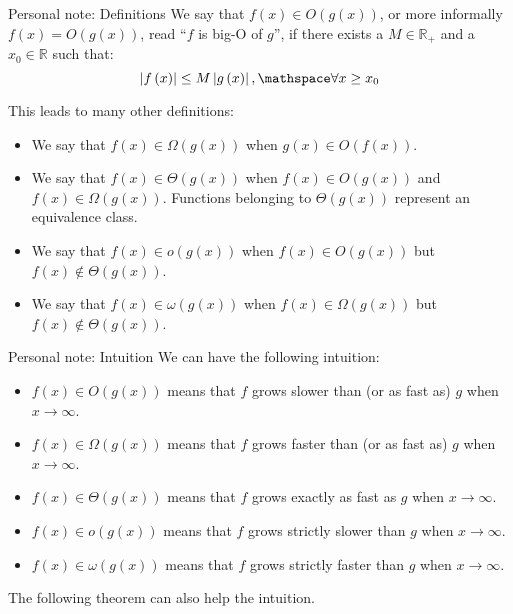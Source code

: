 \documentclass[a4paper]{article}
\begin{document}
\begin{parag}{Personal note: Definitions}
    We say that $f\left(x\right) \in O\left(g\left(x\right)\right)$, or more informally $f\left(x\right) = O\left(g\left(x\right)\right)$, read ``$f$ is big-O of $g$'', if there exists a $M \in \mathbb{R}_+$ and a $x_0 \in \mathbb{R}$ such that: \[\left|f\left(x\right)\right| \leq M \left|g\left(x\right)\right|, \mathspace \forall x \geq x_0\]

    This leads to many other definitions:
    \begin{itemize}
        \item We say that $f\left(x\right) \in \Omega\left(g\left(x\right)\right)$ when $g\left(x\right) \in O\left(f\left(x\right)\right)$. 
        \item We say that $f\left(x\right) \in \Theta\left(g\left(x\right)\right)$ when $f\left(x\right) \in O\left(g\left(x\right)\right)$ and $f\left(x\right) \in \Omega\left(g\left(x\right)\right)$. Functions belonging to $\Theta\left(g\left(x\right)\right)$ represent an equivalence class.
        \item We say that $f\left(x\right) \in o\left(g\left(x\right)\right)$ when $f\left(x\right) \in O\left(g\left(x\right)\right)$ but $f\left(x\right) \not\in \Theta\left(g\left(x\right)\right)$.
        \item We say that $f\left(x\right) \in \omega\left(g\left(x\right)\right)$ when $f\left(x\right) \in \Omega\left(g\left(x\right)\right)$ but $f\left(x\right) \not\in \Theta\left(g\left(x\right)\right)$.
    \end{itemize}

\end{parag}

\begin{parag}{Personal note: Intuition}
    We can have the following intuition:
    \begin{itemize}
        \item $f\left(x\right) \in O\left(g\left(x\right)\right)$ means that $f$ grows slower than (or as fast as) $g$ when $x \to \infty$.
        \item $f\left(x\right) \in \Omega\left(g\left(x\right)\right)$ means that $f$ grows faster than (or as fast as) $g$ when $x \to \infty$.
        \item $f\left(x\right) \in \Theta\left(g\left(x\right)\right)$ means that $f$ grows exactly as fast as $g$ when $x \to \infty$.
        \item $f\left(x\right) \in o\left(g\left(x\right)\right)$ means that $f$ grows strictly slower than $g$ when $x \to \infty$.
        \item $f\left(x\right) \in \omega\left(g\left(x\right)\right)$ means that $f$ grows strictly faster than $g$ when $x \to \infty$.
    \end{itemize}

    The following theorem can also help the intuition.
\end{parag}
\end{document}
